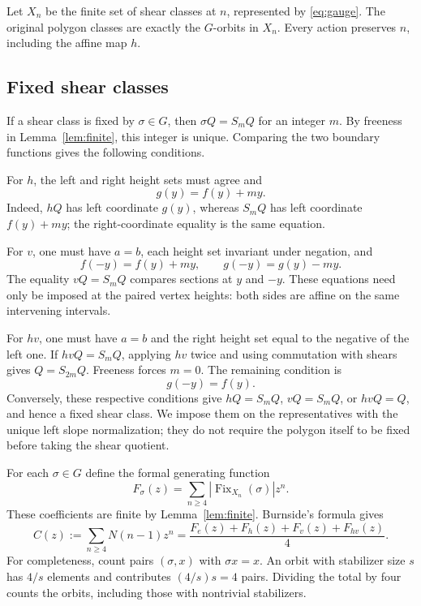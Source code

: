 \documentclass[11pt]{article}
\theoremstyle{remark}
\numberwithin{equation}{section}
\newcommand{\Fix}{\operatorname{Fix}}
\begin{document}
Let $X_n$ be the finite set of shear classes at $n$, represented by
\eqref{eq:gauge}. The original polygon classes are exactly the $G$-orbits
in $X_n$. Every action preserves $n$, including the affine map $h$.

\subsection{Fixed shear classes}

If a shear class is fixed by $\sigma\in G$, then
$\sigma Q=S_mQ$ for an integer $m$.
By freeness in Lemma~\ref{lem:finite}, this integer is unique.
Comparing the two boundary functions gives the following conditions.

For $h$, the left and right height sets must agree and
\begin{equation}\label{eq:h-fixed}
 g(y)=f(y)+m y.
\end{equation}
Indeed, $hQ$ has left coordinate $g(y)$, whereas $S_mQ$ has left
coordinate $f(y)+m y$; the right-coordinate equality is the same equation.

For $v$, one must have $a=b$, each height set invariant under negation, and
\begin{equation}\label{eq:v-fixed}
 f(-y)=f(y)+m y,\qquad g(-y)=g(y)-m y.
\end{equation}
The equality $vQ=S_mQ$ compares sections at $y$ and $-y$.
These equations need only be imposed at the paired vertex heights:
both sides are affine on the same intervening intervals.

For $hv$, one must have $a=b$ and the right height set equal to the negative
of the left one. If $hvQ=S_mQ$, applying $hv$ twice and using commutation
with shears gives $Q=S_{2m}Q$. Freeness forces $m=0$.
The remaining condition is
\begin{equation}\label{eq:hv-fixed}
 g(-y)=f(y).
\end{equation}
Conversely, these respective conditions give $hQ=S_mQ$, $vQ=S_mQ$,
or $hvQ=Q$, and hence a fixed shear class.
We impose them on the representatives with the unique left slope
normalization; they do not require the
polygon itself to be fixed before taking the shear quotient.

For each $\sigma\in G$ define the formal generating function
\[
 F_\sigma(z)=\sum_{n\geq4}|\Fix_{X_n}(\sigma)|z^n.
\]
These coefficients are finite by Lemma~\ref{lem:finite}.
Burnside's formula gives
\begin{equation}\label{eq:burnside}
 C(z):=\sum_{n\geq4}N(n-1)z^n
       =\frac{F_e(z)+F_h(z)+F_v(z)+F_{hv}(z)}4.
\end{equation}
For completeness, count pairs $(\sigma,x)$ with $\sigma x=x$.
An orbit with stabilizer size $s$ has $4/s$ elements and contributes
$(4/s)s=4$ pairs. Dividing the total by four counts the orbits, including
those with nontrivial stabilizers.
\end{document}
